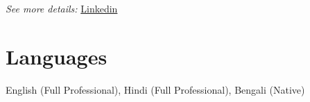 \documentclass[10pt,a4paper]{article}
\begin{document}
{\begin{itemize}[leftmargin=*, noitemsep]
\vspace{0pt}
\noindent
{\centering
\textit{See more details:}  
\href{https://www.linkedin.com/in/abhijit-karmakar/details/certifications/}
{\color{blue}Linkedin}\par}



\section*{Languages}
\vspace{-10pt}
English (Full Professional), Hindi (Full Professional), Bengali (Native)

\end{itemize}



}
\end{document}
